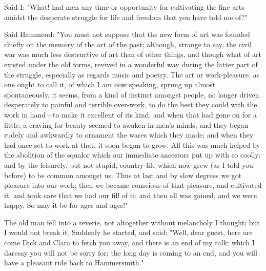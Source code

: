 Said I: "What! had men any time or opportunity for cultivating the fine
arts amidst the desperate struggle for life and freedom that you have
told me of?"

Said Hammond: "You must not suppose that the new form of art was founded
chiefly on the memory of the art of the past; although, strange to say,
the civil war was much less destructive of art than of other things, and
though what of art existed under the old forms, revived in a wonderful
way during the latter part of the struggle, especially as regards music
and poetry. The art or work-pleasure, as one ought to call it, of which
I am now speaking, sprung up almost spontaneously, it seems, from a kind
of instinct amongst people, no longer driven desperately to painful and
terrible over-work, to do the best they could with the work in hand---to
make it excellent of its kind; and when that had gone on for a little, a
craving for beauty seemed to awaken in men's minds, and they began
rudely and awkwardly to ornament the wares which they made; and when
they had once set to work at that, it soon began to grow. All this was
much helped by the abolition of the squalor which our immediate
ancestors put up with so coolly; and by the leisurely, but not stupid,
country-life which now grew (as I told you before) to be common amongst
us. Thus at last and by slow degrees we got pleasure into our work; then
we became conscious of that pleasure, and cultivated it, and took care
that we had our fill of it; and then all was gained, and we were happy.
So may it be for ages and ages!"

The old man fell into a reverie, not altogether without melancholy I
thought; but I would not break it. Suddenly he started, and said: "Well,
dear guest, here are come Dick and Clara to fetch you away, and there is
an end of my talk; which I daresay you will not be sorry for; the long
day is coming to an end, and you will have a pleasant ride back to
Hammersmith."
